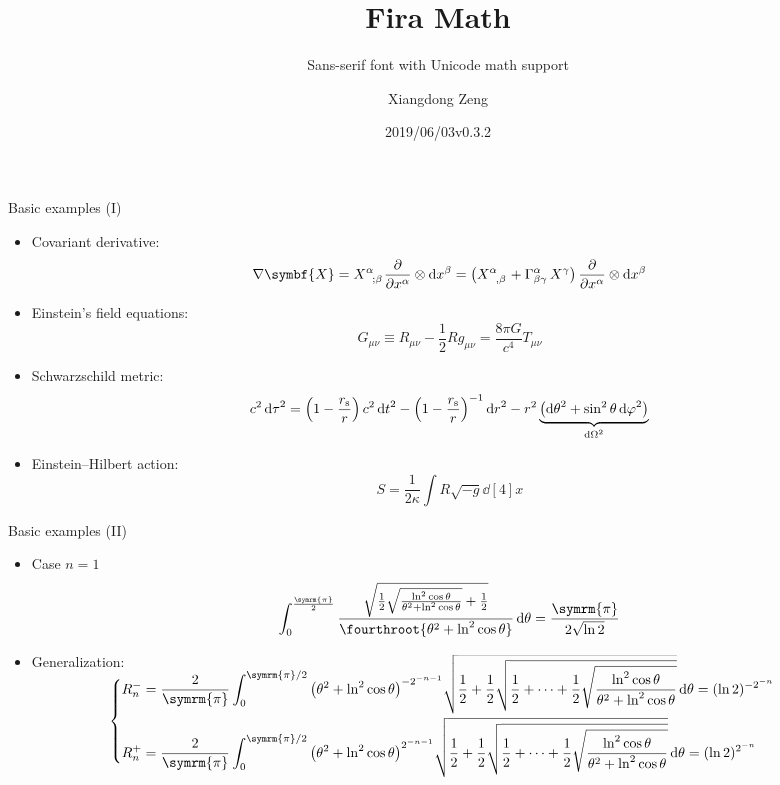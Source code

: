 \documentclass[aspectratio=169]{beamer}
\title{Fira Math}
\subtitle{Sans-serif font with Unicode math support}
\author{Xiangdong Zeng}
\date{2019/06/03\quad v0.3.2}
\def\pp{\symrm{\pi}}
\begin{document}
\maketitle

\begin{frame}{Basic examples (I)}
\begin{itemize}
  \item Covariant derivative:
    \[
      \nabla \symbf{X} = \tensor{X}{^\alpha_{;\beta}} \pdv{x^\alpha} \otimes \dd{x^\beta}
                       = \qty(\tensor{X}{^\alpha_{,\beta}} + \Gamma^{\alpha}_{\beta\gamma} \, X^\gamma) \,
                         \pdv{x^\alpha} \otimes \dd{x^\beta}
    \]
  \item Einstein's field equations:
    \[ G_{\mu\nu} \equiv R_{\mu\nu} - \frac{1}{2} R g_{\mu\nu} = \frac{8\pi G}{c^4} T_{\mu\nu} \]
  \item Schwarzschild metric:
    \[
      c^2 \dd{\tau}^2 = \qty(1-\frac{r_{\mathrm{s}}}{r}) \, c^2 \dd{t}^2
                      - \qty(1-\frac{r_{\mathrm{s}}}{r})^{-1} \dd{r}^2
                      - r^2 \underbrace{\qty(\dd{\theta}^2 + \sin^2 \theta \dd{\varphi}^2)}_{\dd{\Omega}^2}
    \]
  \item Einstein--Hilbert action:
    \[ S = \frac{1}{2\kappa} \int R \sqrt{-g} \dd[4]{x} \]
\end{itemize}
\end{frame}

\begin{frame}{Basic examples (II)}
\begin{itemize}
  \item Case $n=1$
    \small
    \[
      \int_0^{\frac{\pp}{2}}
        \frac{\sqrt{\frac12 \sqrt{\frac{\ln^2\cos\theta}{\theta^2+\ln^2\cos\theta}} + \frac12}}%
            {\fourthroot{\theta^2 + \ln^2\cos\theta}} \dd{\theta}
      = \frac{\pp}{2\sqrt{\ln 2}}
    \]
  \item Generalization:
    \small\vspace{1ex}
    \[
      \begin{cases}
        \smash[t]{\displaystyle
          R_n^- = \frac{2}{\pp} \int_0^{\pp/2} \qty(\theta^2+\ln^2\cos\theta)^{-2^{-n-1}}
                  \sqrt{\frac12+\frac12\sqrt{\frac12+\cdots+\frac12\sqrt{
                        \frac{\ln^2\cos\theta}{\theta^2+\ln^2\cos\theta}}}} \dd{\theta}
                = (\ln 2)^{-2^{-n}}} \\[3ex]
        \smash[b]{\displaystyle
          R_n^+ = \frac{2}{\pp} \int_0^{\pp/2} \qty(\theta^2+\ln^2\cos\theta)^{2^{-n-1}}
                  \sqrt{\frac12+\frac12\sqrt{\frac12+\cdots+\frac12\sqrt{
                        \frac{\ln^2\cos\theta}{\theta^2+\ln^2\cos\theta}}}} \dd{\theta}
                = (\ln 2)^{2^{-n}}}
      \end{cases}
    \]
\end{itemize}
\end{frame}
\end{document}
